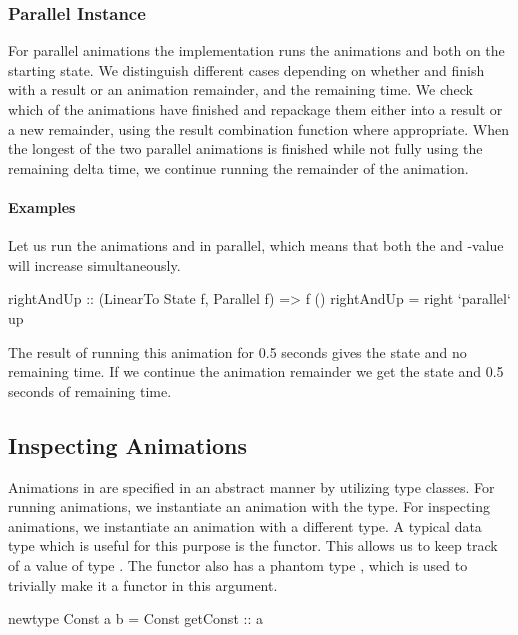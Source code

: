 \subsubsection{Parallel Instance}

For parallel animations the  implementation runs
the animations  and  both on the starting
state. We distinguish different cases depending on whether  and
 finish with a result or an animation remainder, and the remaining
time. We check which of the animations have finished and repackage them
either into a result or a new remainder, using the result combination function
where appropriate. When the longest of the two parallel animations is finished
while not fully using the remaining delta time, we continue running the remainder
of the animation.

\paragraph{Examples}

Let us run the animations  and  in parallel, which means
that both the  and -value will increase simultaneously.

\begin{code}
rightAndUp :: (LinearTo State f, Parallel f) => f ()
rightAndUp = right `parallel` up
\end{code}

The result of running this animation for 0.5 seconds gives the state  and no remaining time. If we continue the animation
remainder we get the state  and 0.5 seconds of remaining 
time.

\subsection{Inspecting Animations}

Animations in \dsl{} are specified in an abstract manner by utilizing type classes. For running animations, we instantiate an animation with the  type. For inspecting animations, we instantiate an animation with a different type. A typical data type which is useful for this purpose is the  functor. This allows us to keep track of a value of type . The  functor also has a phantom type , which is used to trivially make it a functor in this argument.

\begin{spec}
newtype Const a b = Const { getConst :: a }
\end{spec}

